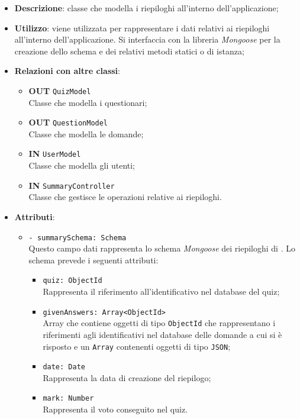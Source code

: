 \begin{itemize}
	\item \textbf{Descrizione}: classe che modella i riepiloghi all'interno dell'applicazione;
	\item \textbf{Utilizzo}: viene utilizzata per rappresentare i dati relativi ai riepiloghi all'interno dell'applicazione. Si interfaccia con la libreria \textit{Mongoose} per la creazione dello schema e dei relativi metodi statici o di istanza;
	\item \textbf{Relazioni con altre classi}:
		\begin{itemize}
			\item \textbf{OUT} \texttt{QuizModel}\\
			Classe che modella i questionari;
			\item \textbf{OUT} \texttt{QuestionModel}\\
			Classe che modella le domande;
			\item \textbf{IN} \texttt{UserModel}\\
			Classe che modella gli utenti;
			\item \textbf{IN} \texttt{SummaryController}\\
			Classe che gestisce le operazioni relative ai riepiloghi.
		\end{itemize}
	\item \textbf{Attributi}:
		\begin{itemize}
			\item \texttt{- summarySchema: Schema} \\
			Questo campo dati rappresenta lo schema \textit{Mongoose} dei riepiloghi di \progetto. Lo schema prevede i seguenti attributi:
				\begin{itemize}
					\item \texttt{quiz: ObjectId}\\ Rappresenta il riferimento all'identificativo nel database del quiz;
					\item \texttt{givenAnswers: Array<ObjectId>}\\ Array che contiene oggetti di tipo \texttt{ObjectId} che rappresentano i riferimenti agli identificativi nel database delle domande a cui si è risposto e un \texttt{Array} contenenti oggetti di tipo \texttt{JSON};	
					\item \texttt{date: Date}\\ Rappresenta la data di creazione del riepilogo;
					\item \texttt{mark: Number}\\ Rappresenta il voto conseguito nel quiz.

\end{itemize}
\end{itemize}
\end{itemize}
